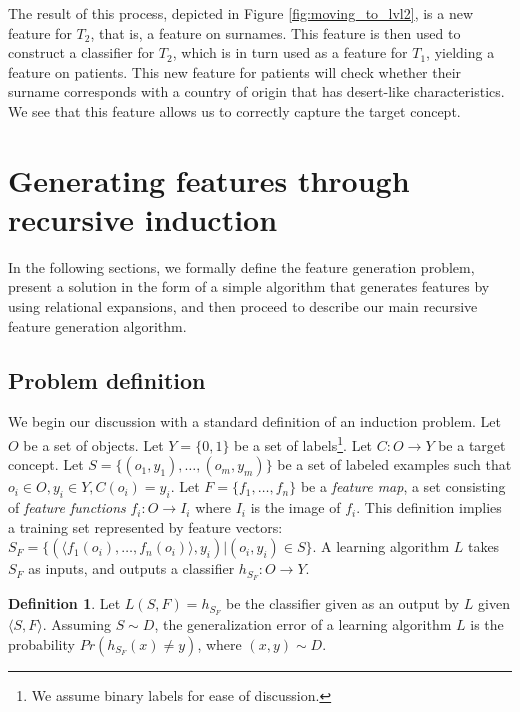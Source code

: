 \documentclass{article}
\theoremstyle{definition}
\newtheorem{defn}{Definition}[section]
\begin{document}
The result of this process, depicted in Figure \ref{fig:moving_to_lvl2}, is a new feature for $T_2$, that is, a feature on surnames. This feature is then used to construct a classifier for $T_2$, which is in turn used as a feature for $T_1$, yielding a feature on patients. This new feature for patients will check whether their surname corresponds with a country of origin that has desert-like characteristics. We see that this feature allows us to correctly capture the target concept.


\section{Generating features through recursive induction} \label{formal}

In the following sections, we formally define the feature generation problem, present a solution  in the form of a simple algorithm that generates features by using
relational expansions, and then proceed to describe our main recursive feature generation algorithm.

\subsection{Problem definition}

We begin our discussion with a standard definition of an induction problem. 
Let $O$ be a set of objects. Let $Y=\{0,1\}$ be a set of labels\footnote{We assume binary labels for ease of discussion.}. Let $C:O\rightarrow Y$ be a target concept. Let $S=\{(o_{1},y_{1}),\ldots,(o_{m},y_{m})\}$ be a set of labeled examples such that $o_{i}\in O, y_{i}\in Y, C(o_i)=y_i$. 
Let $F=\{f_{1},\ldots,f_{n}\}$ be a \emph{feature map}, a set consisting of \emph{feature functions} $f_{i}:O\rightarrow I_{i}$ where $I_{i}$ is the image of $f_i$.  This definition implies a training set represented by feature vectors: $S_F=\{ (\langle f_1(o_i),\ldots,f_n(o_i)\rangle, y_i) | (o_i,y_i) \in S\}$. A learning algorithm $L$ takes $S_F$ as inputs, and outputs a classifier $h_{S_F}:O\rightarrow Y$.
\begin{defn}
	Let $L(S,F)=h_{S_F}$ be the classifier given as an output by $L$ given $\langle S,F\rangle$. Assuming $S\sim D$, the generalization error of a learning algorithm $L$ is the probability $Pr(h_{S_F}(x)\neq y)$, where $(x,y)\sim D$.
\end{defn}
\end{document}
